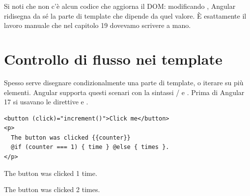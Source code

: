Si noti che non c'è alcun codice che aggiorna il DOM: modificando
, Angular ridisegna da sé la parte di template che dipende da
quel valore. È esattamente il lavoro manuale che nel capitolo 19 dovevamo
scrivere a mano.

\section{Controllo di flusso nei template}

Spesso serve disegnare condizionalmente una parte di template, o iterare su più
elementi. Angular supporta questi scenari con la sintassi /
e . Prima di Angular 17 si usavano le direttive  e
.

\begin{affianco}[0.46][c]
\begin{lstlisting}[style=html, name=counter.component.html]
<button (click)="increment()">Click me</button>
<p>
  The button was clicked {{counter}}
  @if (counter === 1) { time } @else { times }.
</p>
\end{lstlisting}
\risultato
\begin{browser}[counter = 1]
  \par\vspace{4pt}
  {\Lato\large The button was clicked 1 time.\par}
\end{browser}
\begin{browser}[counter = 2]
  \par\vspace{4pt}
  {\Lato\large The button was clicked 2 times.\par}
\end{browser}
\end{affianco}

